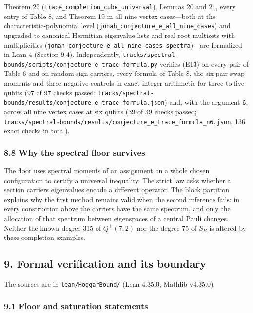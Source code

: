 \documentclass[11pt,a4paper]{article}
\begin{document}
Theorem 22 (\nolinkurl{trace_completion_cube_universal}), Lemmas 20 and 21, every entry of Table 8, and Theorem 19
in all nine vertex cases---both at the characteristic-polynomial level (\nolinkurl{jonah_conjecture_e_all_nine_cases})
and upgraded to canonical Hermitian eigenvalue lists and real root multisets with multiplicities
(\nolinkurl{jonah_conjecture_e_all_nine_cases_spectra})---are formalized in Lean 4 (Section 9.4). Independently,
\nolinkurl{tracks/spectral-bounds/scripts/conjecture_e_trace_formula.py} verifies (E13) on every pair of Table 6 and on random sign
carriers, every formula of Table 8, the six pair-swap moments and three negative controls in exact integer
arithmetic for three to five qubits (97 of 97 checks passed; \nolinkurl{tracks/spectral-bounds/results/conjecture_e_trace_formula.json})
and, with the argument \texttt{6}, across all nine vertex cases at six qubits (39 of 39 checks passed;
\nolinkurl{tracks/spectral-bounds/results/conjecture_e_trace_formula_n6.json}, 136 exact checks in total).

\subsubsection{8.8 Why the spectral floor survives}\label{88-why-the-spectral-floor-survives}

The floor uses spectral moments of an assignment on a whole chosen configuration to certify a
universal inequality. The strict law asks whether a section carrier\textquotesingle s eigenvalues encode a different
operator. The block partition explains why the first method remains valid when the second inference
fails: in every construction above the carriers have the same spectrum, and only the allocation of
that spectrum between eigenspaces of a central Pauli changes. Neither the known degree 315 of
\(Q^+(7,2)\) nor the degree 75 of \(S_B\) is altered by these completion examples.

\subsection{9. Formal verification and its boundary}\label{9-formal-verification-and-its-boundary}

The sources are in \texttt{lean/HoggarBound/} (Lean 4.35.0, Mathlib v4.35.0).

\subsubsection{9.1 Floor and saturation statements}\label{91-floor-and-saturation-statements}
\end{document}
